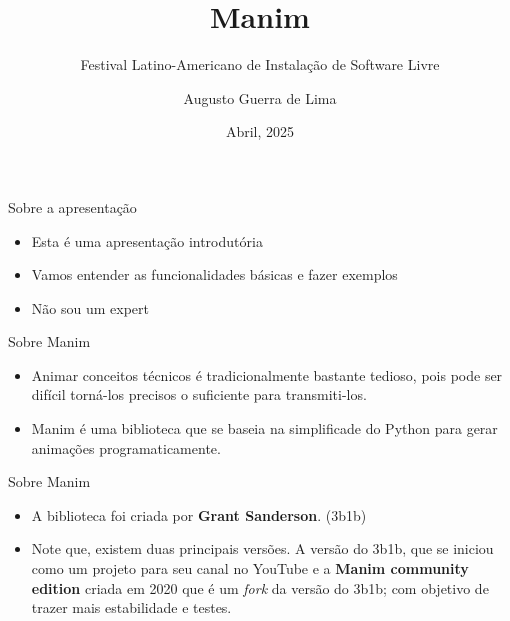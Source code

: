 \documentclass[14pt, aspectratio=169]{beamer}
\title{Manim}
\subtitle{Festival Latino-Americano de Instalação de Software Livre}
\author{Augusto Guerra de Lima}
\date{Abril, 2025}
\begin{document}
\maketitle

\begin{frame}{Sobre a apresentação}
\begin{itemize}
    \item<1-> Esta é uma apresentação introdutória
   
    \item<2-> Vamos entender as funcionalidades básicas e fazer exemplos

     \item<3-> Não sou um expert
\end{itemize}
\end{frame}

\begin{frame}{Sobre Manim}

\begin{itemize}
    \item<1-> Animar conceitos técnicos é tradicionalmente bastante tedioso, pois pode ser difícil torná-los precisos o suficiente para transmiti-los.
    \item<2-> Manim é uma biblioteca que se baseia na simplificade do Python para gerar animações programaticamente.
\end{itemize}

\end{frame}

\begin{frame}{Sobre Manim}
\begin{itemize}
    \item<1-> A biblioteca foi criada por \textbf{Grant Sanderson}. (3b1b)
    \item<2-> Note que, existem duas principais versões. A versão do 3b1b, que se iniciou como um projeto para seu canal no YouTube e a \textbf{Manim community edition} criada em 2020 que é um \textit{fork} da versão do 3b1b; com objetivo de trazer mais estabilidade e testes.
\end{itemize}


\end{frame}
\end{document}
